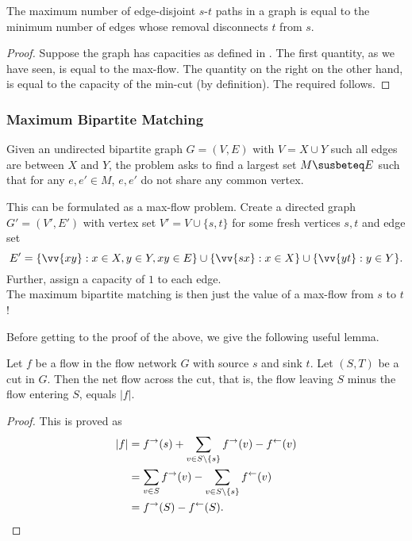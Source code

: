\begin{theorem}
	The maximum number of edge-disjoint $s$-$t$ paths in a graph is equal to the minimum number of edges whose removal disconnects $t$ from $s$.
\end{theorem}
\begin{proof}
	Suppose the graph has capacities as defined in . The first quantity, as we have seen, is equal to the max-flow. The quantity on the right on the other hand, is equal to the capacity of the min-cut (by definition). The required follows.
\end{proof}

\subsubsection{Maximum Bipartite Matching}

Given an undirected bipartite graph $G=(V,E)$ with $V=X\cup Y$ such all edges are between $X$ and $Y$, the problem asks to find a largest set $M\susbeteq E$ such that for any $e,e'\in M$, $e,e'$ do not share any common vertex.

This can be formulated as a max-flow problem. Create a directed graph $G' = (V',E')$ with vertex set $V' = V\cup\{s,t\}$ for some fresh vertices $s,t$ and edge set
\[ E' = \{\vv{xy}: x\in X, y\in Y, xy\in E\} \cup \{\vv{sx} : x\in X\} \cup \{\vv{yt} : y\in Y\}. \]
Further, assign a capacity of $1$ to each edge.\\
The maximum bipartite matching is then just the value of a max-flow from $s$ to $t$!

Before getting to the proof of the above, we give the following useful lemma.

\begin{lemma}
	\label{lem: max bi match}
	Let $f$ be a flow in the flow network $G$ with source $s$ and sink $t$. Let $(S,T)$ be a cut in $G$. Then the net flow across the cut, that is, the flow leaving $S$ minus the flow entering $S$, equals $|f|$.
\end{lemma}
\begin{proof}
	This is proved as
	\begin{align*}
		|f| &= f^\to(s) + \sum_{v\in S\setminus\{s\}} f^\to(v) - f^\leftarrow(v) \\
			&= \sum_{v\in S} f^\to(v) - \sum_{v\in S\setminus\{s\}} f^\leftarrow(v) \\
			&= f^\to(S) - f^\leftarrow(S).
	\end{align*}
\end{proof}

